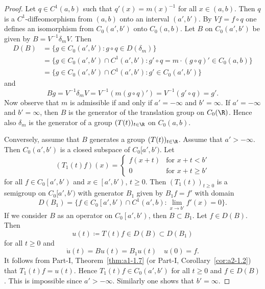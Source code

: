 \begin{proof}
Let $q \in C^{1}(a,b)$ such that $q'(x) = m(x)^{-1}$ for all $x \in (a,b)$.
Then $q$ is a $C^{1}$-diffeomorphism from $(a,b)$ onto an interval $(a',b')$.
By $Vf = f \circ q$ one defines an isomorphism from $C_{0}(a',b')$ onto $C_{0}(a,b)$.
Let $B$ on $C_{0}(a',b')$ be given by $B = V^{-1}\delta_{m}V$.
Then 
\begin{align*}
D(B) &= \{ g \in C_{0}(a',b') \colon g \circ q \in D(\delta_{m}) \} \\
&= \{ g \in C_{0}(a',b') \cap C^{1}(a',b') \colon g' \circ q 
= m \cdot (g \circ q)' \in C_{0}(a,b) \} \\
&= \{ g \in C_{0}(a',b') \cap C^{1}(a',b') \colon g' \in C_{0}(a',b') \}
\end{align*}
and 
%
\[
	Bg = V^{-1}\delta_{m}V = V^{-1}(m(g \circ q)') = V^{-1}(g' \circ q) = g'.
\]
%
Now observe that $m$ is admissible if and only if\/ $a' = -\infty$ and $b' = \infty$.
If\/ $a' = -\infty$ and $b' = \infty$, then $B$ is the generator of the translation group on $C_{0}(\R)$.
Hence also $\delta_{m}$ is the generator of a group $(T(t))_{t \in \R}$ on $C_{0}(a,b)$.

Conversely, assume that $B$ generates a group $(T(t))_{t \in \R}$.
Assume that $a' > -\infty$.
Then $C_{0}(a',b')$ is a closed subspace of\/ $C_{0}[a',b')$.
Let
\begin{equation*}\label{eq:b2-t1}
(T_{1}(t)f)(x) = \begin{cases}
    f(x+t) & \text{for } x+t < b' \\
    0 & \text{for } x+t \geq b'
\end{cases}
\end{equation*}
for all $f \in C_{0}\left[a',b'\right)$ and $x \in \left[a',b'\right)$, $t \geq 0$.
Then $(T_{1}(t))_{t \geq 0}$ is a semigroup on $C_{0}[a',b')$ with generator $B_{1}$ given by 
$B_{1}f = f'$ with domain 
\[
D(B_{1}) = \{ f \in C_{0}\left[a',b'\right) \cap C^{1}(a',b) \colon \lim_{x \to b'} f'(x) = 0 \}.
\]
If we consider $B$ as an operator on $C_{0}\left[a',b'\right)$, then $B \subset B_{1}$.
Let $f \in D(B)$.
Then 
%
\[
	 u(t) \coloneqq T(t)f \in D(B) \subset D(B_{1}) 
\]
%
for all $t \geq 0$ and 
%
\[
	\dot{u}(t) = Bu(t) = B_{1}u(t) \quad u(0) = f.
\]
%
It follows from Part-I, Theorem~\ref{thm:a1-1.7} (or Part-I, Corollary~\ref{cor:a2-1.2})
that $T_{1}(t)f = u(t)$.
Hence $T_{1}(t)f \in C_{0}(a',b')$ for all $t \geq 0$ and $f \in D(B)$.
This is impossible since $a' > -\infty$.
Similarly one shows that $b' = \infty$.
\end{proof}
